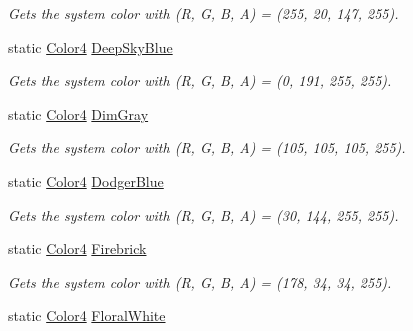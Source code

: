 \begin{DoxyCompactItemize}
\begin{DoxyCompactList}\small\item\em Gets the system color with (R, G, B, A) = (255, 20, 147, 255). \end{DoxyCompactList}\item 
static \hyperlink{struct_open_t_k_1_1_graphics_1_1_color4}{Color4} \hyperlink{struct_open_t_k_1_1_graphics_1_1_color4_a4b81999d278d3eed290ef9a4675261c4}{Deep\-Sky\-Blue}
\begin{DoxyCompactList}\small\item\em Gets the system color with (R, G, B, A) = (0, 191, 255, 255). \end{DoxyCompactList}\item 
static \hyperlink{struct_open_t_k_1_1_graphics_1_1_color4}{Color4} \hyperlink{struct_open_t_k_1_1_graphics_1_1_color4_ac552cb0ae33bd3b1e4cbc0412f840754}{Dim\-Gray}
\begin{DoxyCompactList}\small\item\em Gets the system color with (R, G, B, A) = (105, 105, 105, 255). \end{DoxyCompactList}\item 
static \hyperlink{struct_open_t_k_1_1_graphics_1_1_color4}{Color4} \hyperlink{struct_open_t_k_1_1_graphics_1_1_color4_abc1d257e86234a6c16b8c4c13c7dfda9}{Dodger\-Blue}
\begin{DoxyCompactList}\small\item\em Gets the system color with (R, G, B, A) = (30, 144, 255, 255). \end{DoxyCompactList}\item 
static \hyperlink{struct_open_t_k_1_1_graphics_1_1_color4}{Color4} \hyperlink{struct_open_t_k_1_1_graphics_1_1_color4_a47917d436fb1cb3d26ccbf4946bfba26}{Firebrick}
\begin{DoxyCompactList}\small\item\em Gets the system color with (R, G, B, A) = (178, 34, 34, 255). \end{DoxyCompactList}\item 
static \hyperlink{struct_open_t_k_1_1_graphics_1_1_color4}{Color4} \hyperlink{struct_open_t_k_1_1_graphics_1_1_color4_a2ca0f95c8487831833e2785edbe1a379}{Floral\-White}

\end{DoxyCompactItemize}
